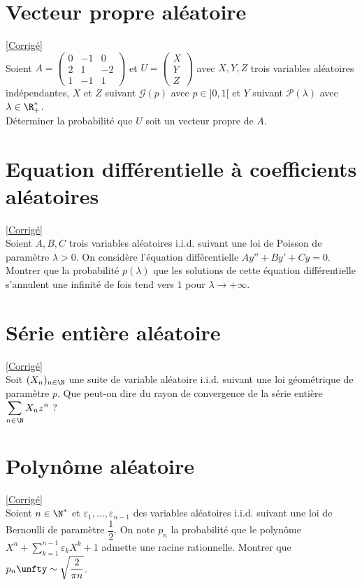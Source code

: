 \documentclass[8pt]{book}
\begin{document}
\section{Vecteur propre aléatoire }
\label{Vecteur propre aléatoire}
\textcolor{blue}{\hyperref[Vecteur propre aléatoire corrigé]{[Corrigé]}}\\
Soient $A=\begin{pmatrix}
	0 &-1&0\\2&1&-2\\1&-1&1\end{pmatrix}$ et $U=\begin{pmatrix}X\\Y\\Z\end{pmatrix}$
avec $X,Y,Z$ trois variables aléatoires indépendantes, $X$ et $Z$ suivant $\mathcal{G}(p)$ avec $p\in]0,1[$ et $Y$ suivant $\mathcal{P}(\lambda)$ avec $\lambda\in\R^*_+$.
\\ Déterminer la probabilité que $U$ soit un vecteur propre de $A$.

\section{Equation différentielle à coefficients aléatoires}
\label{Equation différentielle à coefficients aléatoires}
\textcolor{blue}{\hyperref[Equation différentielle à coefficients aléatoires corrigé]{[Corrigé]}}\\
Soient $A,B,C$ trois variables aléatoires i.i.d. suivant une loi de Poisson de paramètre $\lambda>0$. On considère l'équation différentielle $Ay''+By'+Cy=0$.\\
Montrer que la probabilité $p(\lambda)$ que les solutions de cette équation différentielle s'annulent une infinité de fois tend vers $1$ pour $\lambda\to +\infty$.

\section{Série entière aléatoire}
\label{Série entière aléatoire}
\textcolor{blue}{\hyperref[Série entière aléatoire corrigé]{[Corrigé]}}\\
Soit $(X_n)_{n\in \N}$ une suite de variable aléatoire i.i.d. suivant une loi géométrique de paramètre $p$. Que peut-on dire du rayon de convergence de la série entière $\displaystyle\sum_{n\in \N}X_nz^n$ ?

\section{Polynôme aléatoire }
\label{Polynôme aléatoire}
\textcolor{blue}{\hyperref[Polynôme aléatoire corrigé]{[Corrigé]}}\\
Soient $n\in \N^*$ et $\varepsilon_1,\dots,\varepsilon_{n-1}$ des variables aléatoires i.i.d. suivant une loi de Bernoulli de paramètre $\dfrac{1}{2}$. On note $p_n$ la probabilité que le polynôme $X^n+\displaystyle\sum_{k=1}^{n-1}\varepsilon_kX^k+1$ admette une racine rationnelle. Montrer que $p_n\unfty\sim\displaystyle\sqrt{\frac{2}{\pi n}}$.
\end{document}
